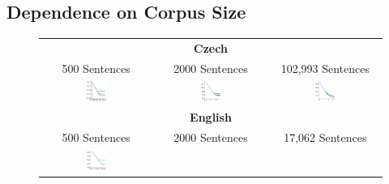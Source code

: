 \documentclass[11pt,letterpaper]{article}
\begin{document}
\subsection{Dependence on Corpus Size}




\begin{figure}
	\begin{centering}
	\begin{tabular}{ccc}
		\multicolumn{3}{c}{\textbf{Czech}} \\ 500 Sentences & 2000 Sentences & 102,993 Sentences \\
		\includegraphics[width=0.2\textwidth]{figures/Czech_500-listener-surprisal-memory-MEDIANS_onlyWordForms_boundedVocab.pdf} &
		\includegraphics[width=0.2\textwidth]{figures/Czech_2000-listener-surprisal-memory-MEDIANS_onlyWordForms_boundedVocab.pdf} &
\includegraphics[width=0.2\textwidth]{figures/Czech-listener-surprisal-memory-MEDIANS_onlyWordForms_boundedVocab.pdf}
\\
		\multicolumn{3}{c}{\textbf{English}} \\ 500 Sentences & 2000 Sentences & 17,062 Sentences \\
		\includegraphics[width=0.2\textwidth]{figures/English_500-listener-surprisal-memory-MEDIANS_onlyWordForms_boundedVocab.pdf} &

\end{tabular}
\end{centering}
\end{figure}
\end{document}
